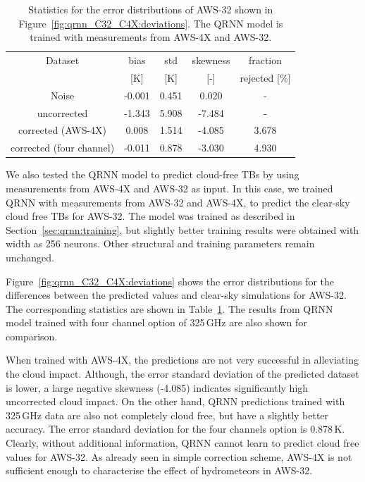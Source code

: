 \documentclass[12pt]{article}
\begin{document}
\begin{table}[!tb]
	\centering
	\begin{tabular}[b]{c|c|c|c|c}
		Dataset  		  &   bias &   std &   skewness & fraction  \\
		&   [K]  &   [K] & [-] & rejected [\%]\\
		\hline
		Noise                      & -0.001 & 0.451 &              0.020 &      - \\
		uncorrected                & -1.343 & 5.908 &             -7.484 &      - \\
		corrected (AWS-4X)         &  0.008 & 1.514 &             -4.085 &      3.678 \\
		corrected (four channel)   & -0.011 & 0.878 &             -3.030 &      4.930 \\
		\hline
	\end{tabular}
	\caption{Statistics for the error distributions of AWS-32 shown in Figure~\ref{fig:qrnn_C32_C4X:deviations}. The QRNN model is trained with measurements from AWS-4X and AWS-32.}
	\label{tab:qrnn:C32:C4X}
\end{table} 
We also tested the QRNN model to predict cloud-free TBs by using measurements
from AWS-4X and AWS-32 as input. In this case, we trained QRNN with
measurements from AWS-32 and AWS-4X, to predict the clear-sky cloud free TBs
for AWS-32. The model was trained as described in
Section~\ref{sec:qrnn:training}, but slightly better training results were
obtained with width as 256 neurons. Other structural and training parameters
remain unchanged.

Figure~\ref{fig:qrnn_C32_C4X:deviations} shows the error distributions for the
differences between the predicted values and clear-sky simulations for AWS-32.
The corresponding statistics are shown in Table~\ref{tab:qrnn:C32:C4X}. The
results from QRNN model trained with four channel option of 325\,GHz are also
shown for comparison.

When trained with AWS-4X, the predictions are not very successful in
alleviating the cloud impact. Although, the error standard deviation of the
predicted dataset is lower, a large negative skewness (-4.085) indicates
significantly high uncorrected cloud impact. On the other hand, QRNN
predictions trained with 325\,GHz data are also not completely cloud free, but
have a slightly better accuracy. The error standard deviation for the four
channels option is 0.878\,K.
Clearly, without additional information, QRNN cannot learn to predict cloud
free values for AWS-32. As already seen in simple correction scheme, AWS-4X is
not sufficient enough to characterise the effect of hydrometeors in AWS-32.
\end{document}
